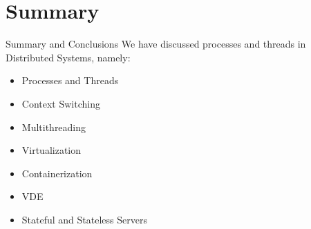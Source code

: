 \section{Summary}
\begin{slide}{Summary and Conclusions}
We have discussed processes and threads
in Distributed Systems, namely:
\begin{itemize}
  \item Processes and Threads
  \item Context Switching
  \item Multithreading
  \item Virtualization
  \item Containerization
  \item VDE
  \item Stateful and Stateless Servers
\end{itemize}  
\end{slide}
